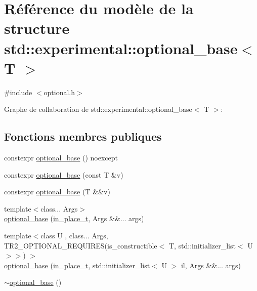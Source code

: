 \hypertarget{structstd_1_1experimental_1_1optional__base}{}\section{Référence du modèle de la structure std\+:\+:experimental\+:\+:optional\+\_\+base$<$ T $>$}
\label{structstd_1_1experimental_1_1optional__base}


{\ttfamily \#include $<$optional.\+h$>$}



Graphe de collaboration de std\+:\+:experimental\+:\+:optional\+\_\+base$<$ T $>$\+:
\subsection*{Fonctions membres publiques}
\begin{DoxyCompactItemize}
\item 
constexpr \hyperlink{structstd_1_1experimental_1_1optional__base_a31134784c4c482947d66c600fe0dcad4}{optional\+\_\+base} () noexcept
\item 
constexpr \hyperlink{structstd_1_1experimental_1_1optional__base_af47cc844bf9d32ad4361be9934c20939}{optional\+\_\+base} (const T \&v)
\item 
constexpr \hyperlink{structstd_1_1experimental_1_1optional__base_ad4839801777f8cfeb048f16b02df4c44}{optional\+\_\+base} (T \&\&v)
\item 
{\footnotesize template$<$class... Args$>$ }\\\hyperlink{structstd_1_1experimental_1_1optional__base_aa5983374de32e763d1b676ccfe834d05}{optional\+\_\+base} (\hyperlink{structstd_1_1experimental_1_1in__place__t}{in\+\_\+place\+\_\+t}, Args \&\&... args)
\item 
{\footnotesize template$<$class U , class... Args, T\+R2\+\_\+\+O\+P\+T\+I\+O\+N\+A\+L\+\_\+\+R\+E\+Q\+U\+I\+R\+E\+S(is\+\_\+constructible$<$ T, std\+::initializer\+\_\+list$<$ U $>$$>$) $>$ }\\\hyperlink{structstd_1_1experimental_1_1optional__base_ae63b6e3b01c36339007f52f4069c1f4f}{optional\+\_\+base} (\hyperlink{structstd_1_1experimental_1_1in__place__t}{in\+\_\+place\+\_\+t}, std\+::initializer\+\_\+list$<$ U $>$ il, Args \&\&... args)
\item 
\hyperlink{structstd_1_1experimental_1_1optional__base_ad89678b8ebde087b1f3f61466a7436b9}{$\sim$optional\+\_\+base} ()
\end{DoxyCompactItemize}
